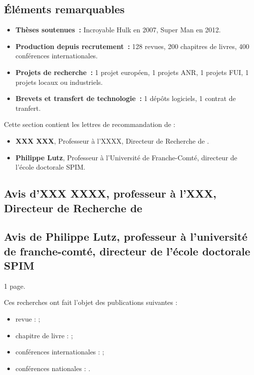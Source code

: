 \documentclass[french]{hdrapplication}
\begin{document}
\subsection{\'Eléments remarquables}

\begin{itemize}
\item \textbf{Thèses soutenues~:} Incroyable Hulk en 2007, Super Man en 2012.
\item \textbf{Production depuis recrutement~:} 128 revues, 200 chapitres de livres, 400 conférences internationales.
\item \textbf{Projets de recherche~:} 1 projet européen, 1 projets ANR, 1 projets FUI, 1 projets locaux ou industriels.
\item \textbf{Brevets et transfert de technologie~:} 1 dépôts logiciels, 1 contrat de tranfert.
\end{itemize}


Cette section contient les lettres de recommandation de :


\begin{itemize}
\item \textbf{XXX XXX}, Professeur à l'XXXX, Directeur de Recherche de .\parbreak
\item \textbf{Philippe Lutz}, Professeur à l'Université de Franche-Comté, directeur de l'école doctorale SPIM.
\end{itemize}

\pagebreak

\subsection{Avis d'XXX XXXX, professeur à l'XXX, Directeur de Recherche de }


\subsection{Avis de Philippe Lutz, professeur à l'université de franche-comté, directeur de l'école doctorale SPIM}


1 page.



Ces recherches ont fait l'objet des publications suivantes :
\begin{itemize}
\item revue : ;
\item chapitre de livre : ;
\item conférences internationales : ;
\item conférences nationales : .
\end{itemize}
\end{document}
